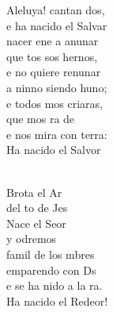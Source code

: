 \begin{cancion}
	Aleluya! cantan dos,\\
	e ha nacido el Salvar  \\
\jump
	 nacer ene a anunar\\
	que tos sos hernos,\\
	e no quiere renunar\\
	a ninno siendo huno; \\
	e todos mos criaras, \\
	que mos ra de   \\
	e nos mira con terra:\\
	Ha nacido el Salvor  \\\jump\\
	\begin{chorus}%
	Brota el Ar \\
	del to de Jes\\
	Nace el Seor \\
	y odremos \\
	 famil de los mbres  \\
	 emparendo con Ds  \\
	e se ha nido a la ra.\\
	Ha nacido el Redeor!\\
	\end{chorus}%
	\jump\\
	      \\
\end{cancion}%
